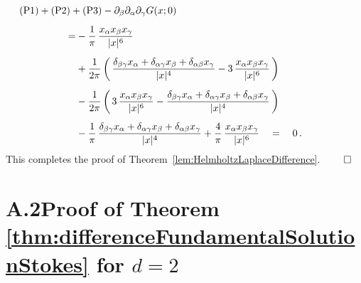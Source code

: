 \begin{samepage}
\begin{align*}
  &\hspace{-2cm}\mathrm{(P1)} + \mathrm{(P2)} + \mathrm{(P3)} - \partial_\beta \partial_\alpha \partial_\gamma G(x; 0) \\[0.5em]
  = &- \frac{1}{\pi}\, \frac{x_\alpha x_\beta x_\gamma}{|x|^6} \\[0.5em]
    &+ \frac{1}{2\pi} \, \bigg(\,\frac{\delta_{\beta\gamma} x_\alpha + \delta_{\alpha \gamma} x_\beta + \delta_{\alpha \beta} x_\gamma}{|x|^4} - 3\, \frac{x_\alpha x_\beta x_\gamma}{|x|^6} \, \bigg) \\[0.5em]
    &- \frac{1}{2\pi} \, \bigg( \, 3\, \frac{x_\alpha x_\beta x_\gamma}{|x|^6} - \frac{\delta_{\beta\gamma} x_\alpha + \delta_{\alpha\gamma} x_\beta + \delta_{\alpha\beta} x_\gamma}{|x|^4} \, \bigg)\\[0.5em]
   &- \frac{1}{\pi}\, \frac{\delta_{\beta \gamma} x_\alpha + \delta_{\alpha \gamma} x_\beta + \delta_{\alpha\beta} x_\gamma}{|x|^4} 
     + \frac{4}{\pi}\, \frac{x_\alpha x_\beta x_\gamma}{|x|^6} 
     \quad=\quad 0 \,. 
\end{align*}
This completes the proof of Theorem~\ref{lem:HelmholtzLaplaceDifference}. \hfill$\qed$
\end{samepage}


\section*{A.2\quad Proof of Theorem \ref{thm:differenceFundamentalSolutionStokes} for $d = 2$}
\label{sec:A2}

